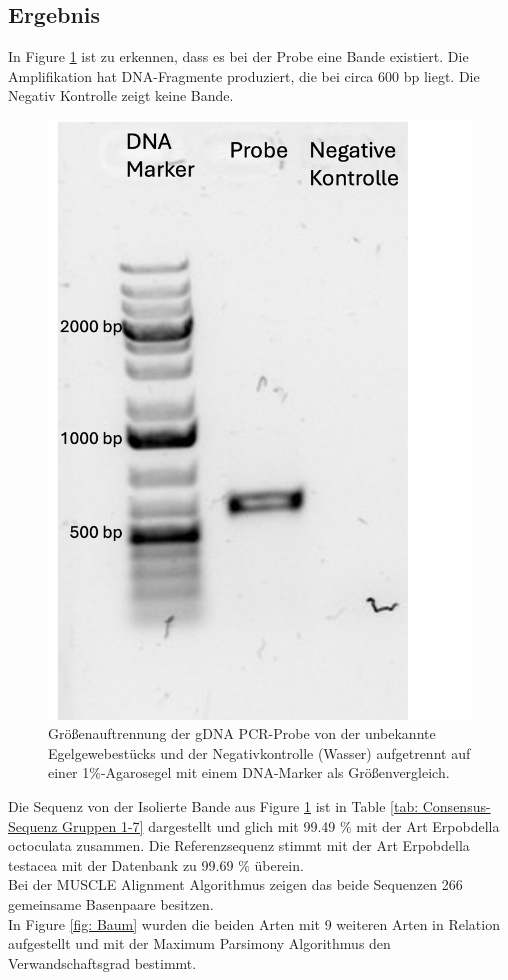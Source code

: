\documentclass[oneside,10pt,a4paper]{report}
\begin{document}
			
			\subsection{Ergebnis}
				In Figure \ref{fig:Agarosegel} ist zu erkennen, dass es bei der Probe eine Bande existiert. Die Amplifikation hat DNA-Fragmente produziert, die bei circa 600 bp liegt. Die Negativ Kontrolle zeigt keine Bande.
				
				\begin{figure}[H]
					\centering
					\includegraphics[scale=0.7]{gel.png}
					\caption{Größenauftrennung der gDNA PCR-Probe von der unbekannte Egelgewebestücks und der Negativkontrolle (Wasser) aufgetrennt auf einer 1$\%$-Agarosegel mit einem DNA-Marker als Größenvergleich.}
					\label{fig:Agarosegel}
				\end{figure}
				
				Die Sequenz von der Isolierte Bande aus Figure \ref{fig:Agarosegel} ist in Table \ref{tab: Consensus-Sequenz Gruppen 1-7} dargestellt und glich mit 99.49 $\%$ mit der Art Erpobdella octoculata zusammen. Die Referenzsequenz stimmt mit der Art Erpobdella testacea mit der Datenbank zu 99.69 $\%$ überein.\\
				Bei der MUSCLE Alignment Algorithmus zeigen das beide Sequenzen 266 gemeinsame Basenpaare besitzen. \\
				In Figure \ref{fig: Baum} wurden die beiden Arten mit 9 weiteren Arten in Relation aufgestellt und mit der Maximum Parsimony Algorithmus den Verwandschaftsgrad bestimmt.
				
\end{document}
